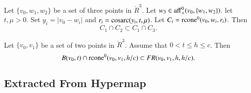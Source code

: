 \begin{tarskidata}
\begin{tarski}
\begin{proved}
\swallowed\end{proved}
\end{tarski}





\begin{tarski}

\begin{lemma}
Let $\{v_0,w_1,w_2\}$ be a set of three points in $\ring{R}^3$.
Let $w_3 \in {\operatorname{aff}}_+^0(v_0,\{w_1,w_2\})$.
let $t,\mu > 0$.  Set $y_i=|v_0-w_i|$
and $r_i={\operatorname{cosarc}}(y_i,t,\mu)$.
Let $C_i={\operatorname{rcone}}^0(v_0,w_i,r_i)$.
Then
  $$
  C_1 \cap C_2 \subset C_1 \cap C_3.
  $$
\end{lemma}

\begin{proved}
\swallowed\end{proved}
\end{tarski}






\begin{tarski}

\begin{lemma}
Let $\{v_0,v_1\}$ be a set of two points in $\ring{R}^3$.
Assume that $0 < t \le h \le c$.  Then
$$
B(v_0,t) \cap {\operatorname{rcone}}^0(v_0,v_1,h/c) \subset
FR(v_0,v_1,h,h/c).
$$
\end{lemma}

\begin{proved}
\swallowed\end{proved}
\end{tarski}








\begin{tarski}
\section{Extracted From Hypermap}


\end{tarski}
\end{tarskidata}
